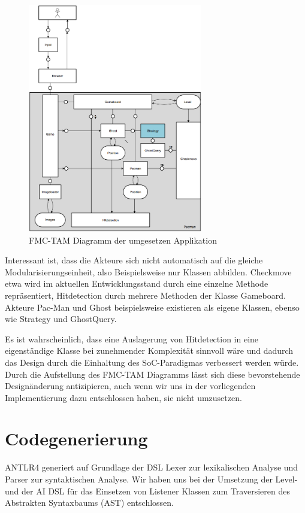 \documentclass[conference]{IEEEtran}
\begin{document}
\begin{figure}[!t]
\centering
\includegraphics[width=3.0in]{tam.png}

\caption{FMC-TAM Diagramm der umgesetzen Applikation}
\label{fmc_tam}
\end{figure}

Interessant ist, dass die Akteure sich nicht automatisch auf die gleiche Modularisierungseinheit, also Beispielsweise nur  Klassen abbilden. Checkmove etwa wird im aktuellen Entwicklungsstand durch eine einzelne Methode repräsentiert, Hitdetection durch mehrere Methoden der Klasse Gameboard. Akteure Pac-Man und Ghost beispielsweise existieren als eigene Klassen, ebenso wie Strategy und GhostQuery.

Es ist wahrscheinlich, dass eine Auslagerung von Hitdetection in eine eigenständige Klasse bei zunehmender Komplexität sinnvoll wäre und dadurch das Design durch die Einhaltung des SoC-Paradigmas verbessert werden würde. Durch die Aufstellung des FMC-TAM Diagramms lässt sich diese bevorstehende Designänderung antizipieren, auch wenn wir uns in der vorliegenden Implementierung dazu entschlossen haben, sie nicht umzusetzen.

\section{Codegenerierung}
ANTLR4 generiert auf Grundlage der DSL Lexer zur lexikalischen Analyse und Parser zur syntaktischen Analyse.
Wir haben uns bei der Umsetzung der Level- und der AI DSL für  das Einsetzen von Listener Klassen zum Traversieren des Abstrakten Syntaxbaums (AST) entschlossen.
\end{document}
